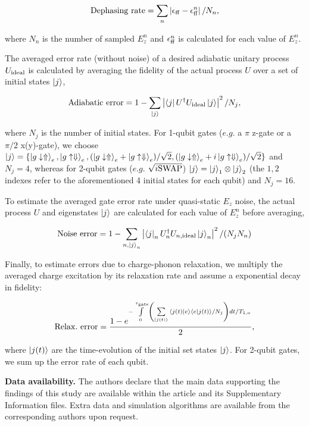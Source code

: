 \documentclass[aps,prb,superscriptaddress,nobibnotes,preprint]{revtex4-1}%
\begin{document}
{\begin{equation}
{\rm Dephasing~rate}=\sum\limits_{n}{\left|\epsilon_{\rm ff}-\epsilon_{\rm ff}^n\right|/N_n},
\end{equation}

where $N_n$ is the number of sampled $E_z^n$ and $\epsilon_{\rm ff}^n$ is calculated for each value of $E_z^n$. 

The averaged error rate (without noise) of a desired adiabatic unitary process $U_{\rm ideal}$ is calculated by averaging the fidelity of the actual process $U$ over a set of initial states $\ket{j}$,

\begin{equation}
{\rm Adiabatic~error}=1-\sum\limits_{\ket{j}}{\left|\bra{j}U^\dagger U_{\rm ideal}\ket{j}\right|^2/N_j},
\end{equation}

where $N_j$ is the number of initial states. For 1-qubit gates ($e.g.$ a $\pi$ z-gate or a $\pi/2$ x(y)-gate), we choose $\ket{j}=\{\ket{g\downarrow\Uparrow}_e,\ket{g\uparrow\Downarrow}_e,(\ket{g\downarrow\Uparrow}_e+\ket{g\uparrow\Downarrow}_e)/\sqrt{2},(\ket{g\downarrow\Uparrow}_e+i\ket{g\uparrow\Downarrow}_e)/\sqrt{2}\}$ and $N_j=4$, whereas for 2-qubit gates ($e.g.$ $\sqrt{i{\rm SWAP}}$) $\ket{j}=\ket{j}_1\otimes\ket{j}_2$ (the ${1,2}$ indexes refer to the aforementioned 4 initial states for each qubit) and $N_j=16$.

To estimate the averaged gate error rate under quasi-static $E_z$ noise, the actual process $U$ and eigenstates $\ket{j}$ are calculated for each value of $E_z^n$ before averaging,

\begin{equation}
{\rm Noise~error}=1-\sum\limits_{n,\ket{j}_n}{\left|\bra{j}_nU_n^\dagger U_{n,\rm ideal}\ket{j}_n\right|^2/(N_jN_n)}
\end{equation}

Finally, to estimate errors due to charge-phonon relaxation, we multiply the averaged charge excitation by its relaxation rate and assume a exponential decay in fidelity:

\begin{equation}
{\rm Relax.~error}=\frac{1-e^{-\int\limits_{0}^{\tau_{\rm gate}}\left({\sum\limits_{\ket{j(t)}}{\braket{j(t)|e}\braket{e|j(t)}/N_j
}}\right)dt/T_{1, \rm o}}}{2},
\end{equation}

where $\ket{j(t)}$ are the time-evolution of the initial set states $\ket{j}$. For 2-qubit gates, we sum up the error rate of each qubit.


\vspace{3mm}
\noindent\textbf{Data availability.}
%
The authors declare that the main data supporting the findings of this study are available within the article and its Supplementary Information files. Extra data and simulation algorithms are available from the corresponding authors upon request.

}
\end{document}
